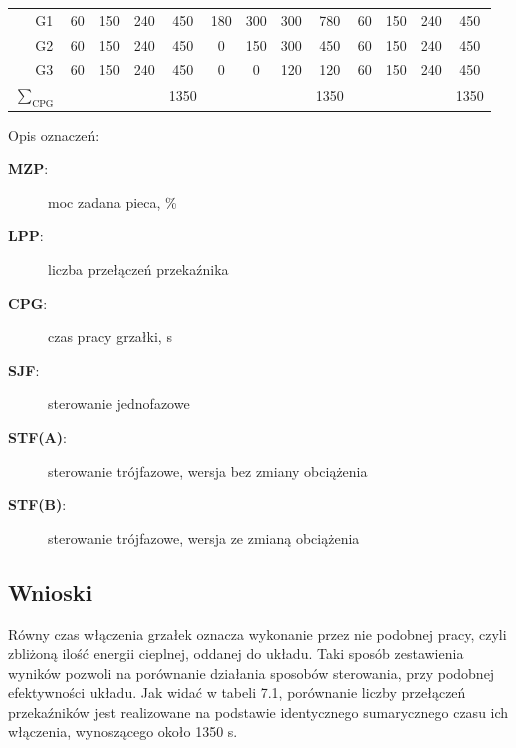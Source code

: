 \documentclass[a4paper,twoside,12pt]{book}
\begin{document}
\begin{table}[h]
\begin{tabular}{|c|c|c|c|c|c|c|c|c|c|c|c|c|c|}
		\hline
		\parbox[t]{2mm}{} & G1                        & 60                          & 150                         & 240    & 450                   & 180  & 300 & 300    & 780 & 60  & 150 & 240    & 450 \\
		                                                                   & G2                        & 60                          & 150                         & 240    & 450                   & 0    & 150 & 300    & 450 & 60  & 150 & 240    & 450 \\
		                                                                   & G3                        & 60                          & 150                         & 240    & 450                   & 0    & 0   & 120    & 120 & 60  & 150 & 240    & 450 \\
		\hline
		                          &     & 1350                        &        & 1350   &  & 1350                                                 \\
		\hline
	\end{tabular}
\end{table}

\noindent Opis oznaczeń:
\begin{description}
	\item[\textbf{MZP}:]moc zadana pieca, \%
	\item[\textbf{LPP}:]liczba przełączeń przekaźnika
	\item[\textbf{CPG}:]czas pracy grzałki, s
	\item[\textbf{SJF}:]sterowanie jednofazowe
	\item[\textbf{STF(A)}:]sterowanie trójfazowe, wersja bez zmiany obciążenia
	\item[\textbf{STF(B)}:]sterowanie trójfazowe, wersja ze zmianą obciążenia
\end{description}

\newpage
\subsection{Wnioski}
Równy czas włączenia grzałek oznacza wykonanie przez nie podobnej pracy, czyli zbliżoną ilość energii cieplnej, oddanej do układu. Taki sposób zestawienia wyników pozwoli na porównanie działania sposobów sterowania, przy podobnej efektywności układu. Jak widać w tabeli 7.1, porównanie liczby przełączeń przekaźników jest realizowane na podstawie identycznego sumarycznego czasu ich włączenia, wynoszącego około 1350 s.
\end{document}
